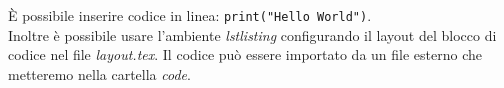 È possibile inserire codice in linea: \verb!print("Hello World")!.\\
Inoltre è possibile usare l'ambiente \textit{lstlisting} configurando il layout del blocco di codice nel file \textit{layout.tex}. Il codice può essere importato da un file esterno che metteremo nella cartella \textit{code}.
